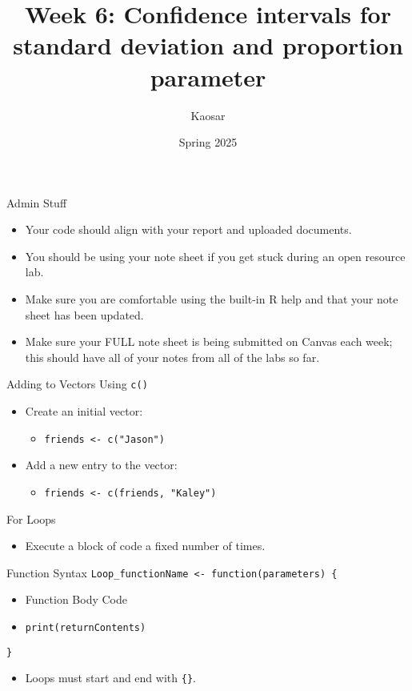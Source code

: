 \documentclass{beamer}
\title{Week 6: Confidence intervals for standard deviation and proportion parameter}
\author{Kaosar}
\institute{Auburn University}
\date{Spring 2025}
\begin{document}
\frame{\titlepage}

\begin{frame}{Admin Stuff}
    \begin{itemize}
        \item Your code should align with your report and uploaded documents.
        \item You should be using your note sheet if you get stuck during an open resource lab.
        \item Make sure you are comfortable using the built-in R help and that your note sheet has been updated.
        \item Make sure your FULL note sheet is being submitted on Canvas each week; this should have all of your notes from all of the labs so far.
    \end{itemize}
\end{frame}

\begin{frame}{Adding to Vectors Using \texttt{c()}}
    \begin{itemize}
        \item Create an initial vector:
        \begin{itemize}
            \item \texttt{friends <- c("Jason")}
        \end{itemize}
        \item Add a new entry to the vector:
        \begin{itemize}
            \item \texttt{friends <- c(friends, "Kaley")}
        \end{itemize}
    \end{itemize}
\end{frame}

\begin{frame}{For Loops}
    \begin{itemize}
        \item Execute a block of code a fixed number of times.
    \end{itemize}
    \begin{block}{Function Syntax}
\texttt{Loop\_functionName <- function(parameters) \{}
\begin{itemize}
    \item Function Body Code
    \item \texttt{print(returnContents)}
\end{itemize}
\texttt{\}}
    \end{block}

    \begin{itemize}
        \item Loops must start and end with \texttt{\{\}}.
    \end{itemize}
\end{frame}
\end{document}
